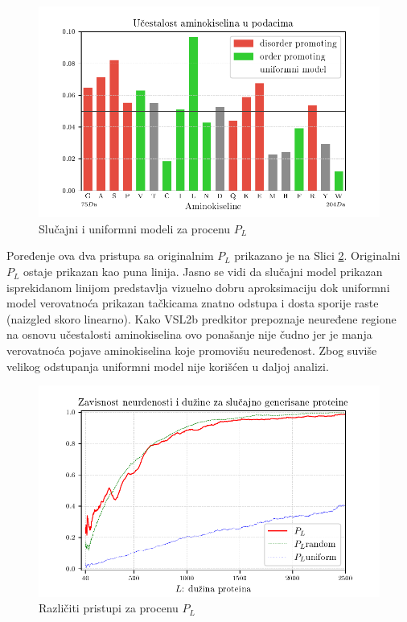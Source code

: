 \begin{figure}[th]
\centering
\includegraphics[]{plots/AK_ucestalost}
\decoRule
\caption{Slučajni i uniformni modeli za procenu $P_L$}
\label{fig:AK_ucestalost}
\end{figure}



Poređenje ova dva pristupa sa originalnim $P_L$ prikazano je na Slici
\ref{fig:PL2}.  Originalni $P_L$ ostaje prikazan kao puna linija. Jasno se vidi
da slučajni model prikazan isprekidanom linijom predstavlja vizuelno dobru
aproksimaciju dok uniformni model verovatnoća prikazan tačkicama znatno odstupa
i dosta sporije raste (naizgled skoro linearno). Kako VSL2b predkitor
prepoznaje neuređene regione na osnovu učestalosti aminokiselina ovo ponašanje
nije čudno jer je manja verovatnoća pojave aminokiselina koje promovišu
neuređenost. Zbog suviše velikog odstupanja uniformni model nije korišćen u
daljoj analizi.


\begin{figure}[th]
\centering
\includegraphics[]{plots/PL_F_cmp}
\decoRule
\caption{Različiti pristupi za procenu $P_L$}
\label{fig:PL2}
\end{figure}


